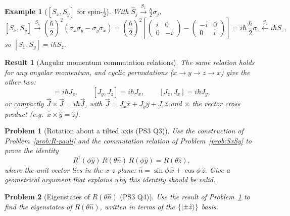 \documentclass{article}
\newtheorem{problem}{Problem}
\newtheorem*{example}{Example}
\newtheorem{result}{Result}
\begin{document}
\begin{example}[{$[S_x,S_y]$ for spin-$\tfrac12$}]
    With $\hat{S}_j \xrightarrow{S_z} \frac{\hbar}{2}\sigma_j$,
    \[[S_x,S_y] \xrightarrow{S_z} \left(\frac{\hbar}{2}\right)^2\left(\sigma_x\sigma_y - \sigma_y\sigma_x\right) = \left(\frac{\hbar}{2}\right)^2\left[\begin{pmatrix} i & 0 \\ 0 & -i \end{pmatrix} - \begin{pmatrix} -i & 0 \\ 0 & i \end{pmatrix}\right] = i\hbar\,\frac{\hbar}{2}\sigma_z \xleftarrow{S_z} i\hbar S_z,\]
    so $[S_x,S_y] = i\hbar S_z$.
\end{example}
\begin{result}[Angular momentum commutation relations]
    The same relation holds for any angular momentum, and cyclic permutations ($x \to y \to z \to x$) give the other two:
    \begin{equation}
        [J_x,J_y] = i\hbar J_z, \qquad [J_y,J_z] = i\hbar J_x, \qquad [J_z,J_x] = i\hbar J_y,
    \end{equation}
    or compactly $\vec{J}\times\vec{J} = i\hbar\vec{J}$, with $\vec{J} = J_x\hat{x} + J_y\hat{y} + J_z\hat{z}$ and $\times$ the vector cross product (e.g.\ $\hat{x}\times\hat{y} = \hat{z}$).
\end{result}
\begin{problem}[Rotation about a tilted axis (PS3 Q3)]
    \label{prob:R-tilt}
    Use the construction of Problem~\ref{prob:R-pauli} and the commutation relation of Problem~\ref{prob:SxSy} to prove the identity
    \[R^\dagger(\phi\hat{y})\,R(\theta\hat{n})\,R(\phi\hat{y}) = R(\theta\hat{z}),\]
    where the unit vector lies in the $x$-$z$ plane: $\hat{n} = \sin\phi\,\hat{x} + \cos\phi\,\hat{z}$. Give a geometrical argument that explains why this identity should be valid.
\end{problem}
\begin{problem}[Eigenstates of $R(\theta\hat{n})$ (PS3 Q4)]
    Use the result of Problem~\ref{prob:R-tilt} to find the eigenstates of $R(\theta\hat{n})$, written in terms of the $\{\ket{\pm\hat{z}}\}$ basis.
\end{problem}
\end{document}
